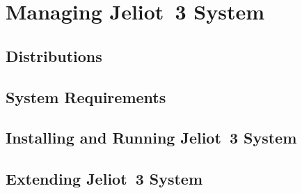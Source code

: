 \section{Managing Jeliot~3 System}
\label{sec:Managing_Jeliot_3_System}


\subsection{Distributions}
\label{sec:Distributions}


\subsection{System Requirements}
\label{sec:System_Requirements}


\subsection{Installing and Running Jeliot~3 System}
\label{sec:Installing_and_Running_Jeliot_3_System}


\subsection{Extending Jeliot~3 System}
\label{sec:Extending_Jeliot_3_System}